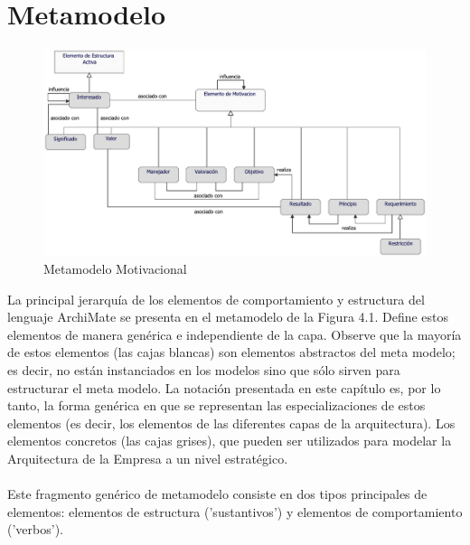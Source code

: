 \section{Metamodelo}
\begin{figure}[h!]
	\centering
	\includegraphics[width=1.0\linewidth]{imgs/meta/Motivacion}
	\caption{Metamodelo Motivacional}
\end{figure}

La principal jerarquía de los elementos de comportamiento y estructura del lenguaje ArchiMate se presenta en el metamodelo de la Figura 4.1. Define estos elementos de manera genérica e independiente de la capa. Observe que la mayoría de estos elementos (las cajas blancas) son elementos abstractos del meta modelo; es decir, no están instanciados en los modelos sino que sólo sirven para estructurar el meta modelo.  La notación presentada en este capítulo es, por lo tanto, la forma genérica en que se representan las especializaciones de estos elementos (es decir, los elementos de las diferentes capas de la arquitectura).  Los elementos concretos (las cajas grises), que pueden ser utilizados para modelar la Arquitectura de la Empresa a un nivel estratégico.\\ \\

Este fragmento genérico de metamodelo consiste en dos tipos principales de elementos: elementos de estructura ('sustantivos') y elementos de comportamiento ('verbos').

\newpage








